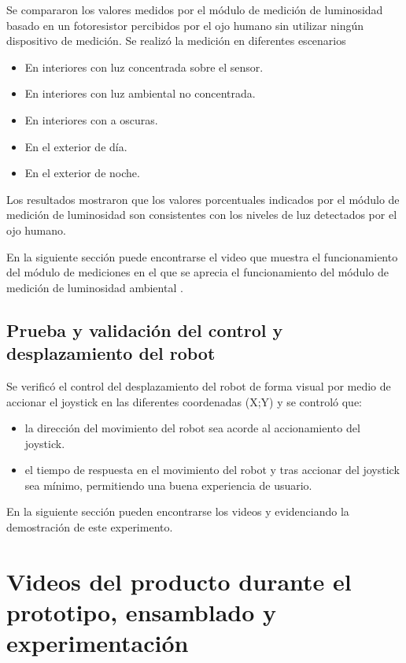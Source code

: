 Se compararon los valores medidos por el módulo de medición de luminosidad basado en un fotoresistor percibidos por el ojo humano sin utilizar ningún dispositivo de medición. Se realizó la medición en diferentes escenarios

\begin{itemize}
	\item En interiores con luz concentrada sobre el sensor.
	\item En interiores con luz ambiental no concentrada.
	\item En interiores con a oscuras.
	\item En el exterior de día.
	\item En el exterior de noche.
\end{itemize}

Los resultados mostraron que los valores porcentuales indicados por el módulo de medición de luminosidad son consistentes con los niveles de luz detectados por el ojo humano.

En la siguiente sección puede encontrarse el video que muestra el funcionamiento del módulo de mediciones en el que se aprecia el funcionamiento del módulo de medición de luminosidad ambiental \cite{Demo_Mediciones}.

\subsection{Prueba y validación del control y desplazamiento del robot}

Se verificó el control del desplazamiento del robot de forma visual por medio de accionar el joystick en las diferentes coordenadas (X;Y) y se controló que:

\begin{itemize}
	\item la dirección del movimiento del robot sea acorde al accionamiento del joystick.
	\item el tiempo de respuesta en el movimiento del robot y tras accionar del joystick sea mínimo, permitiendo una buena experiencia de usuario.
\end{itemize}

En la siguiente sección pueden encontrarse los videos \cite{Demo_Control_Movimiento_1} y \cite{Demo_Control_Movimiento_2} evidenciando la demostración de este experimento.



\section{Videos del producto durante el prototipo, ensamblado y experimentación}

